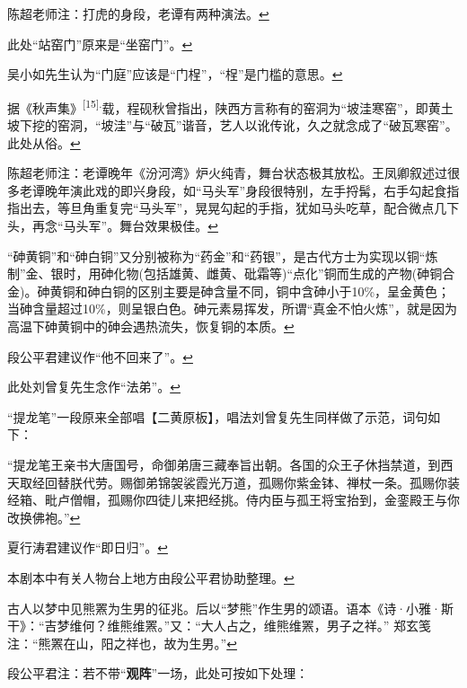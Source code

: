 \item
  \leavevmode\hypertarget{fn351}{}%
  陈超老师注：打虎的身段，老谭有两种演法。\protect\hyperlink{fnref351}{↩}
\item
  \leavevmode\hypertarget{fn352}{}%
  此处``站窑门''原来是``坐窑门''。\protect\hyperlink{fnref352}{↩}
\item
  \leavevmode\hypertarget{fn353}{}%
  吴小如先生认为``门庭''应该是``门桯''，``桯''是门槛的意思。\protect\hyperlink{fnref353}{↩}
\item
  \leavevmode\hypertarget{fn354}{}%
  据《秋声集》\textsuperscript{{[}15{]}.}载，程砚秋曾指出，陕西方言称有的窑洞为``坡洼寒窑''，即黄土坡下挖的窑洞，``坡洼''与``破瓦''谐音，艺人以讹传讹，久之就念成了``破瓦寒窑''。此处从俗。\protect\hyperlink{fnref354}{↩}
\item
  \leavevmode\hypertarget{fn355}{}%
  陈超老师注：老谭晚年《汾河湾》炉火纯青，舞台状态极其放松。王凤卿叙述过很多老谭晚年演此戏的即兴身段，如``马头军''身段很特别，左手捋髯，右手勾起食指指出去，等旦角重复完``马头军''，晃晃勾起的手指，犹如马头吃草，配合微点几下头，再念``马头军''。舞台效果极佳。\protect\hyperlink{fnref355}{↩}
\item
  \leavevmode\hypertarget{fn356}{}%
  ``砷黄铜''和``砷白铜''又分别被称为``药金''和``药银''，是古代方士为实现以铜``炼制''金、银时，用砷化物(包括雄黄、雌黄、砒霜等)``点化''铜而生成的产物(砷铜合金)。砷黄铜和砷白铜的区别主要是砷含量不同，铜中含砷小于10\%，呈金黄色；当砷含量超过10\%，则呈银白色。砷元素易挥发，所谓``真金不怕火炼''，就是因为高温下砷黄铜中的砷会遇热流失，恢复铜的本质。\protect\hyperlink{fnref356}{↩}
\item
  \leavevmode\hypertarget{fn357}{}%
  段公平君建议作``他不回来了''。\protect\hyperlink{fnref357}{↩}
\item
  \leavevmode\hypertarget{fn358}{}%
  此处刘曾复先生念作``法弟''。\protect\hyperlink{fnref358}{↩}
\item
  \leavevmode\hypertarget{fn359}{}%
  ``提龙笔''一段原来全部唱【二黄原板】，唱法刘曾复先生同样做了示范，词句如下：

  ``提龙笔王亲书大唐国号，命御弟唐三藏奉旨出朝。各国的众王子休挡禁道，到西天取经回替朕代劳。赐御弟锦袈裟霞光万道，孤赐你紫金钵、禅杖一条。孤赐你装经箱、毗卢僧帽，孤赐你四徒儿来把经挑。侍内臣与孤王将宝抬到，金銮殿王与你改换佛袍。''\protect\hyperlink{fnref359}{↩}
\item
  \leavevmode\hypertarget{fn360}{}%
  夏行涛君建议作``即日归''。\protect\hyperlink{fnref360}{↩}
\item
  \leavevmode\hypertarget{fn361}{}%
  本剧本中有关人物台上地方由段公平君协助整理。\protect\hyperlink{fnref361}{↩}
\item
  \leavevmode\hypertarget{fn362}{}%
  古人以梦中见熊罴为生男的征兆。后以``梦熊''作生男的颂语。语本《诗·小雅·斯干》：``吉梦维何？维熊维罴。''又：``大人占之，维熊维罴，男子之祥。''
  郑玄笺注：``熊罴在山，阳之祥也，故为生男。''\protect\hyperlink{fnref362}{↩}
\item
  \leavevmode\hypertarget{fn363}{}%
  段公平君注：若不带``\textbf{观阵}''一场，此处可按如下处理：

